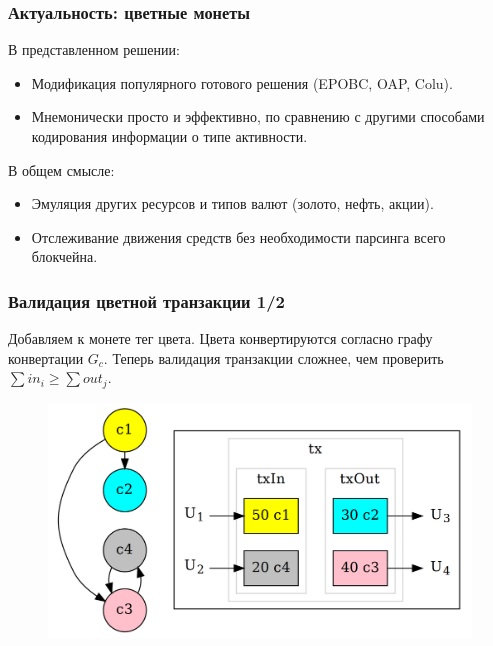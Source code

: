 \documentclass[11pt,handout,pdf,hyperref={unicode}]{beamer}
\begin{document}
\begin{frame}
  \frametitle{Актуальность: цветные монеты}

  В представленном решении:
  \begin{itemize}
  \item Модификация популярного готового решения (EPOBC, OAP, Colu).
  \item Мнемонически просто и эффективно, по сравнению с другими
    способами кодирования информации о типе активности.
  \end{itemize}

  В общем смысле:
  \begin{itemize}
  \item Эмуляция других ресурсов и типов валют (золото, нефть, акции).
  \item Отслеживание движения средств без необходимости парсинга всего
    блокчейна.
  \end{itemize}
\end{frame}

\begin{frame}
  \frametitle{Валидация цветной транзакции 1/2}

  Добавляем к монете тег цвета. Цвета конвертируются согласно графу
  конвертации $G_c$. Теперь валидация транзакции сложнее, чем
  проверить $\sum{in_i} \geq \sum {out_j}$.

  \begin{figure}[t]
  \includegraphics[scale=0.17]{pres_colortx.png}
  \centering
  \end{figure}

\end{frame}
\end{document}

